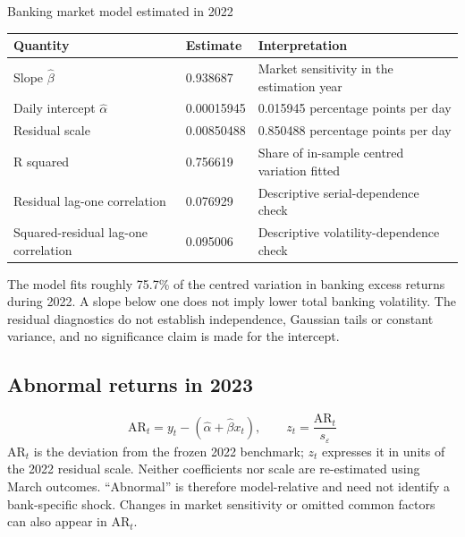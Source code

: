 \documentclass[11pt,a4paper]{article}
\newcommand{\reporttablefont}{\fontsize{9.4}{11.7}\selectfont}
\begin{document}
\begin{minipage}{\linewidth}\captionsetup{type=table}\caption{Banking market model estimated in 2022}\reporttablefont\renewcommand{\arraystretch}{1.22}\begin{tabular}{@{}L{0.300000\dimexpr{}\tabcolsep\relax}C{0.164286\dimexpr{}\tabcolsep\relax}L{0.535714\dimexpr{}\tabcolsep\relax}@{}}\toprule
{\sffamily\bfseries\color{navy}Quantity} & {\sffamily\bfseries\color{navy}Estimate} & {\sffamily\bfseries\color{navy}Interpretation}\\\midrule
Slope $\widehat\beta$ & 0.938687 & Market sensitivity in the estimation year\\
Daily intercept $\widehat\alpha$ & 0.00015945 & 0.015945 percentage points per day\\
Residual scale & 0.00850488 & 0.850488 percentage points per day\\
R squared & 0.756619 & Share of in-sample centred variation fitted\\
Residual lag-one correlation & 0.076929 & Descriptive serial-dependence check\\
Squared-residual lag-one correlation & 0.095006 & Descriptive volatility-dependence check\\
\bottomrule\end{tabular}\end{minipage}\par\vspace{5pt}
The model fits roughly 75.7\% of the centred variation in banking excess returns during 2022. A slope below one does not imply lower total banking volatility. The residual diagnostics do not establish independence, Gaussian tails or constant variance, and no significance claim is made for the intercept.

\subsection*{Abnormal returns in 2023}
\begin{equation}\mathrm{AR}_t=y_t-(\hat\alpha+\hat\beta x_t),\qquad z_t=\frac{\mathrm{AR}_t}{s_\varepsilon}\label{eq:abnormal}\end{equation}
$\mathrm{AR}_t$ is the deviation from the frozen 2022 benchmark; $z_t$ expresses it in units of the 2022 residual scale. Neither coefficients nor scale are re-estimated using March outcomes. \textquotedblleft{}Abnormal\textquotedblright{} is therefore model-relative and need not identify a bank-specific shock. Changes in market sensitivity or omitted common factors can also appear in $\mathrm{AR}_t$.
\end{document}
